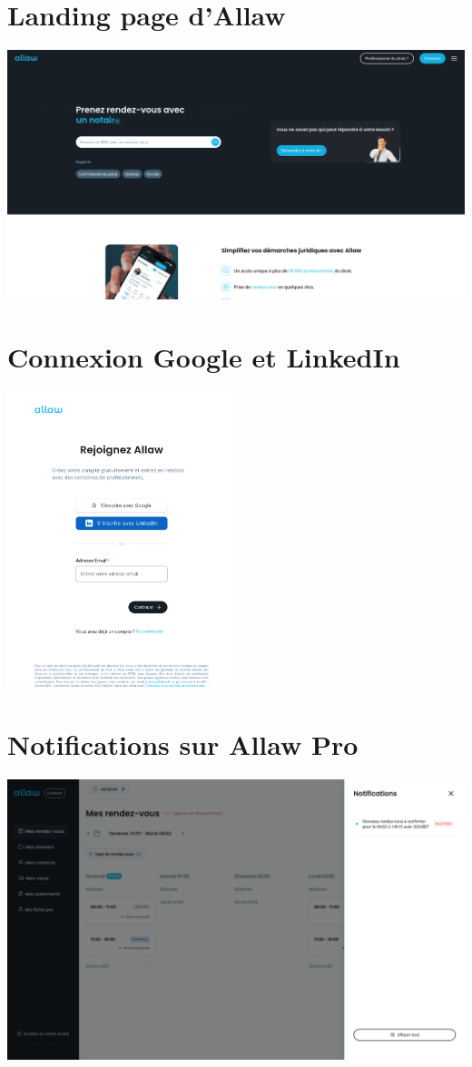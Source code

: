 
\section{Landing page d'Allaw}\label{appendix:landing_page}

\includegraphics[width=1.0\textwidth]{media/screenshot_allaw_landing_page.png}

\section{Connexion Google et LinkedIn}\label{appendix:signup}

\includegraphics[width=0.5\textwidth]{media/screenshot_allaw_signup.png}

\section{Notifications sur Allaw Pro}\label{appendix:notifications}

\includegraphics[width=1.0\textwidth]{media/screenshot_notif.png}
